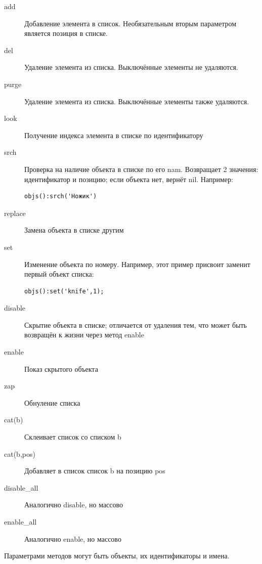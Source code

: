 \documentclass[a4paper,12pt]{article}
\begin{document}
\begin{description}
\item[add]  Добавление элемента в список. Необязательным вторым параметром является позиция в списке.
\item[del]  Удаление элемента из списка. Выключённые элементы не удаляются.
\item[purge]  Удаление элемента из списка. Выключённые элементы также удаляются.
\item[look]  Получение индекса элемента в списке по идентификатору
\item[srch]  Проверка на наличие объекта в списке по его nam. Возвращает 2 значения: идентификатор и позицию; если объекта нет, вернёт nil. Например: \begin{verbatim}objs():srch('Ножик')\end{verbatim}
\item[replace]  Замена объекта в списке другим
\item[set]  Изменение объекта по номеру. Например, этот пример присвоит заменит первый объект списка: \begin{verbatim}objs():set('knife',1);\end{verbatim}
\item[disable]  Скрытие объекта в списке; отличается от удаления тем, что может быть возвращён к жизни через метод enable
\item[enable]  Показ скрытого объекта
\item[zap]  Обнуление списка
\item[cat(b)]  Склеивает список со списком b
\item[cat(b,pos)] Добавляет в список список b на позицию pos
\item[disable\_all]  Аналогично disable, но массово
\item[enable\_all]  Аналогично enable, но массово
\end{description}

Параметрами методов могут быть объекты, их идентификаторы и имена.
\end{document}
